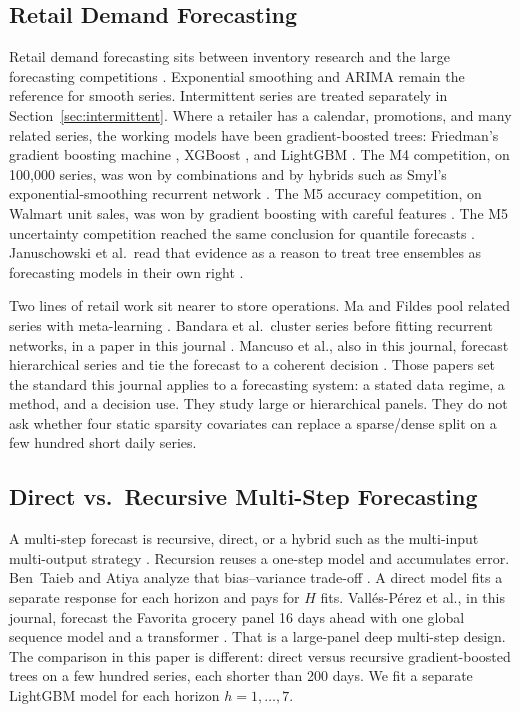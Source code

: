 \documentclass[review,authoryear]{elsarticle}
\begin{document}
\subsection{Retail Demand Forecasting}

Retail demand forecasting sits between inventory research and the large forecasting competitions \citep{fildes2022retail,syntetos2016supply,petropoulos2022practice}. Exponential smoothing and ARIMA remain the reference for smooth series. Intermittent series are treated separately in Section~\ref{sec:intermittent}. Where a retailer has a calendar, promotions, and many related series, the working models have been gradient-boosted trees: Friedman's gradient boosting machine \citep{friedman2001gbm}, XGBoost \citep{chen2016xgboost}, and LightGBM \citep{ke2017lightgbm}. The M4 competition, on 100{,}000 series, was won by combinations and by hybrids such as Smyl's exponential-smoothing recurrent network \citep{makridakis2020m4,smyl2020hybrid}. The M5 accuracy competition, on Walmart unit sales, was won by gradient boosting with careful features \citep{makridakis2022m5}. The M5 uncertainty competition reached the same conclusion for quantile forecasts \citep{makridakis2022m5uncertainty}. Januschowski et al.\ read that evidence as a reason to treat tree ensembles as forecasting models in their own right \citep{januschowski2022trees}.

Two lines of retail work sit nearer to store operations. Ma and Fildes pool related series with meta-learning \citep{ma2021metalearning}. Bandara et al.\ cluster series before fitting recurrent networks, in a paper in this journal \citep{bandara2020clustering}. Mancuso et al., also in this journal, forecast hierarchical series and tie the forecast to a coherent decision \citep{mancuso2021eswa}. Those papers set the standard this journal applies to a forecasting system: a stated data regime, a method, and a decision use. They study large or hierarchical panels. They do not ask whether four static sparsity covariates can replace a sparse/dense split on a few hundred short daily series.

\subsection{Direct vs.\ Recursive Multi-Step Forecasting}

A multi-step forecast is recursive, direct, or a hybrid such as the multi-input multi-output strategy \citep{bentaieb2012review}. Recursion reuses a one-step model and accumulates error. Ben~Taieb and Atiya analyze that bias--variance trade-off \citep{bentaieb2016bias}. A direct model fits a separate response for each horizon and pays for $H$ fits. Vall\'es-P\'erez et al., in this journal, forecast the Favorita grocery panel 16 days ahead with one global sequence model and a transformer \citep{valles2022eswa}. That is a large-panel deep multi-step design. The comparison in this paper is different: direct versus recursive gradient-boosted trees on a few hundred series, each shorter than 200 days. We fit a separate LightGBM model for each horizon $h = 1,\ldots,7$.
\end{document}
